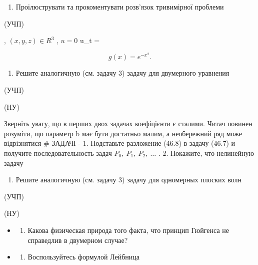 \documentclass[
  ukrainian,
]{article}
\providecommand{\tightlist}{%
  \setlength{\itemsep}{0pt}\setlength{\parskip}{0pt}}
\begin{document}
\begin{enumerate}
\def\labelenumi{\arabic{enumi}.}
\setcounter{enumi}{2}
\tightlist
\item
  Проілюструвати та прокоментувати розв'язок тривимірної проблеми
\end{enumerate}

(УЧП)

, \((x, y, z) \in R^3\) , \(u = 0\) u\_t =

\[
g(x) = e^{-x^2}.
\]

\begin{enumerate}
\def\labelenumi{\arabic{enumi}.}
\setcounter{enumi}{3}
\tightlist
\item
  Решите аналогичную (см. задачу 3) задачу для двумерного уравнения
\end{enumerate}

(УЧП)

(НУ)

Зверніть увагу, що в перших двох задачах коефіцієнти є сталими. Читач
повинен розуміти, що параметр b має бути достатньо малим, а необережний
ряд може відрізнятися \# ЗАДАЧІ - 1. Подставьте разложение (46.8) в
задачу (46.7) и получите последовательность задач
\(P_0,\ P_1,\ P_2,\ \dots\) . 2. Покажите, что нелинейную задачу

\begin{enumerate}
\def\labelenumi{\arabic{enumi}.}
\setcounter{enumi}{4}
\tightlist
\item
  Решите аналогичную (см. задачу 3) задачу для одномерных плоских волн
\end{enumerate}

(УЧП)

(НУ)

\begin{itemize}
\tightlist
\item
  \begin{enumerate}
  \def\labelenumi{\arabic{enumi}.}
  \setcounter{enumi}{5}
  \tightlist
  \item
    Какова физическая природа того факта, что принцип Гюйгенса не
    справедлив в двумерном случае?
  \end{enumerate}
\item
  \begin{enumerate}
  \def\labelenumi{\arabic{enumi}.}
  \setcounter{enumi}{6}
  \tightlist
  \item
    Воспользуйтесь формулой Лейбница
  \end{enumerate}
\end{itemize}
\end{document}

